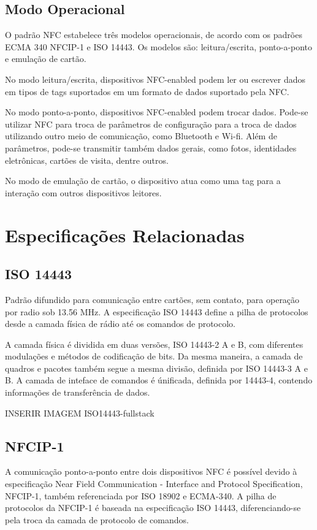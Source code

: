 \documentclass[a4paper,oneside]{article}
\begin{document}
\subsection{Modo Operacional}
O padrão NFC estabelece três modelos operacionais, de acordo com os padrões ECMA 340 NFCIP-1 e ISO 14443. Os modelos são: leitura/escrita, ponto-a-ponto e emulação de cartão.

No modo leitura/escrita, dispositivos NFC-enabled podem ler ou escrever dados em tipos de tags suportados em um formato de dados suportado pela NFC.

No modo ponto-a-ponto, dispositivos NFC-enabled podem trocar dados. Pode-se utilizar NFC para troca de parâmetros de configuração para a troca de dados utilizando outro meio de comunicação, como Bluetooth e Wi-fi. Além de parâmetros, pode-se transmitir também dados gerais, como fotos, identidades eletrônicas, cartões de visita, dentre outros.

No modo de emulação de cartão, o dispositivo atua como uma tag para a interação com outros dispositivos leitores.

\section{Especificações Relacionadas}
\subsection{ISO 14443}
Padrão difundido para comunicação entre cartões, sem contato, para operação por radio sob 13.56 MHz. A especificação ISO 14443\cite{iso14443} define a pilha de protocolos desde a camada física de rádio até os comandos de protocolo.

A camada física é dividida em duas versões, ISO 14443-2 A e B, com diferentes modulações e métodos de codificação de bits. Da mesma maneira, a camada de quadros e pacotes também segue a mesma divisão, definida por ISO 14443-3 A e B. A camada de inteface de comandos é únificada, definida por 14443-4, contendo informações de transferência de dados.

INSERIR IMAGEM {ISO14443-fullstack}

\subsection{NFCIP-1}
A comunicação ponto-a-ponto entre dois dispositivos NFC é possível devido à especificação Near Field Communication - Interface and Protocol Specification, NFCIP-1, também referenciada por ISO 18902 e ECMA-340. A pilha de protocolos da NFCIP-1 é baseada na especificação ISO 14443, diferenciando-se pela troca da camada de protocolo de comandos.
\end{document}
